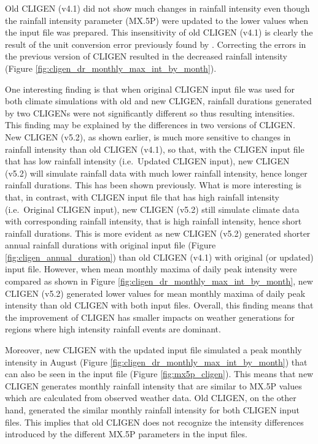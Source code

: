 Old CLIGEN (v4.1) did not show much changes in rainfall intensity even though
the rainfall intensity parameter ({MX.5P}) were updated to the lower values when
the input file was prepared. This insensitivity of old CLIGEN (v4.1) is clearly
the result of the unit conversion error previously found by \citet{yu2000-301}.
Correcting the errors in the previous version of CLIGEN resulted in the
decreased rainfall intensity (Figure
\ref{fig:cligen_dr_monthly_max_int_by_month}).

One interesting finding is that when original CLIGEN input file was used for
both climate simulations with old and new CLIGEN, rainfall durations generated
by two CLIGENs were not significantly different so thus resulting intensities.
This finding may be explained by the differences in two versions of CLIGEN. New
CLIGEN (v5.2), as shown earlier, is much more sensitive to changes in rainfall
intensity than old CLIGEN (v4.1), so that, with the CLIGEN input file that has
low rainfall intensity (i.e.\ Updated CLIGEN input), new CLIGEN (v5.2) will
simulate rainfall data with much lower rainfall intensity, hence longer rainfall
durations. This has been shown previously. What is more interesting is that,
in contrast, with CLIGEN input file that has high rainfall intensity
(i.e.\ Original CLIGEN input), new CLIGEN (v5.2) still simulate climate data
with corresponding rainfall intensity, that is high rainfall intensity, hence
short rainfall durations. This is more evident as new CLIGEN (v5.2) generated
shorter annual rainfall durations with original input file (Figure
\ref{fig:cligen_annual_duration}) than old CLIGEN (v4.1) with original (or
updated) input file. However, when mean monthly maxima of daily peak intensity
were compared as shown in Figure \ref{fig:cligen_dr_monthly_max_int_by_month},
new CLIGEN (v5.2) generated lower values for mean monthly maxima of daily peak
intensity than old CLIGEN with both input files. Overall, this finding means
that the improvement of CLIGEN has smaller impacts on weather generations for
regions where high intensity rainfall events are dominant.

Moreover, new CLIGEN with the updated input file simulated a peak monthly
intensity in August (Figure \ref{fig:cligen_dr_monthly_max_int_by_month}) that
can also be seen in the input file (Figure \ref{fig:mx5p_cligen}). This means
that new CLIGEN generates monthly rainfall intensity that are similar
to {MX.5P} values which are calculated from observed weather data. Old CLIGEN,
on the other hand, generated the similar monthly rainfall intensity for both
CLIGEN input files. This implies that old CLIGEN does not recognize the
intensity differences introduced by the different {MX.5P} parameters in the
input files.

